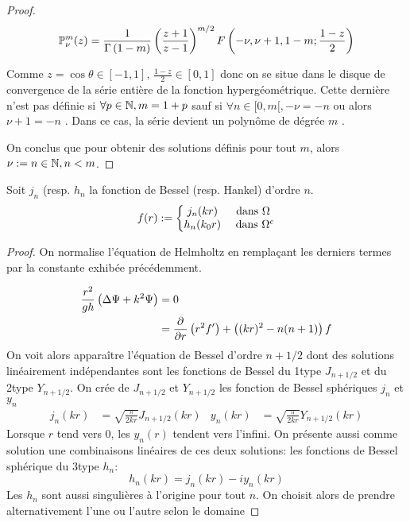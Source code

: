 \begin{proof}
{\[
\mathbb{P}^m_\nu(z) = \dfrac{1}{\Gamma\left(1-m\right)}\left(\dfrac{z+1}{z-1}\right)^{m/2}F\left(-\nu,\nu+1,1-m;\dfrac{1-z}{2}\right)
\]

Comme $z=\cos\theta \in [-1,1] $, $\frac{1-z}{2} \in [0,1]$ donc on se situe dans le disque de convergence de la série entière de la fonction hypergéométrique. Cette dernière n'est pas définie si $\forall p\in \mathbb N, m=1+p $ sauf si $\forall n \in [0,m[, -\nu = -n $ ou alors $ \nu +1 = -n $ \cite[p.~556]{abramowitz_handbook_1964}. Dans ce cas, la série devient un polynôme de dégrée $m$ \cite[p.~561]{abramowitz_handbook_1964}.

On conclus que pour obtenir des solutions définis pour tout $m$, alors $\nu:=n \in \mathbb N, n< m $.
}


\end{proof}


\begin{prop} Soit $j_n$ (resp. $h_n$ la fonction de Bessel (resp. Hankel) d'ordre $n$.
  \begin{equation}
    f(r) := \left\lbrace
    \begin{matrix}
    j_n(kr) & \text{ dans $\Omega$ } \\
    h_n(k_0r) & \text{ dans } \Omega^c \\
    \end{matrix}\right.
  \end{equation}
\end{prop}
\begin{proof}
On normalise l'équation de Helmholtz en remplaçant les derniers termes par la constante exhibée précédemment.

\begin{align*}
\dfrac{r^2}{gh} \left(\Delta \Psi + k^2 \Psi\right) &= 0 \\
&= \dfrac{\partial^{{}} }{{\partial r}^{{}}}\left(r^2f'\right) + \left((kr)^2 - n(n+1)\right)f
\end{align*}
  On voit alors apparaître l'équation de Bessel d'ordre $n +1/2$ dont des solutions linéairement indépendantes sont les fonctions de Bessel du 1\ier type $J_{n+1/2}$ et du 2\ieme type $Y_{n+1/2}$\cite[p.~86]{bohren_absorption_2004}\cite[p.~1465]{morse_methods_1953}. 
  On crée de $J_{n+1/2}$ et $Y_{n+1/2}$ les fonction de Bessel sphériques $j_n$ et $y_n$ 
  \begin{align*}
  j_n(kr) &= \sqrt{\frac{\pi}{2kr}}J_{n+1/2}(kr) &
  y_n(kr) &= \sqrt{\frac{\pi}{2kr}}Y_{n+1/2}(kr)
  \end{align*}
  Lorsque $r$ tend vers $0$, les $y_n(r)$ tendent vers l'infini. On présente aussi comme solution une combinaisons linéaires de ces deux solutions: les fonctions de Bessel sphérique du 3\ieme type $h_n$:
  \[
  h_n(kr)=j_n(kr)-i y_n(kr)
  \]
  Les $h_n$ sont aussi singulières à l'origine pour tout $n$. On choisit alors de prendre alternativement l'une ou l'autre selon le domaine
  \end{proof}


